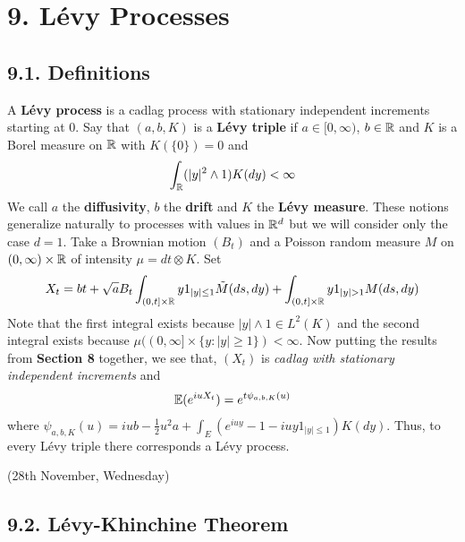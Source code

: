 \documentclass[12pt,a4paper]{report}
\begin{document}
\section*{9. L\'{e}vy Processes}

\subsection{9.1. Definitions}

A \textbf{L\'{e}vy process} is a cadlag process with stationary independent increments starting at 0. Say that $(a,b,K)$ is a \textbf{L\'{e}vy triple} if $a\in [0,\infty)$, $b\in \mathbb{R}$ and $K$ is a Borel measure on $\mathbb{R}$ with $K(\{0\}) =0$ and
\begin{align*}
\int_{\mathbb{R}} (|y|^2 \wedge 1) K(dy) < \infty
\end{align*}
We call $a$ the \textbf{diffusivity}, $b$ the \textbf{drift} and $K$ the \textbf{L\'{e}vy measure}. These notions generalize naturally to processes with values in $\mathbb{R}^d$ but we will consider only the case $d = 1$. Take a Brownian motion $(B_t)$ and a Poisson random measure $M$ on $(0,\infty) \times \mathbb{R}$ of intensity $\mu = dt \otimes K$. Set
\begin{align*}
X_t = bt + \sqrt{a} B_t \int_{(0,t]\times \reals} y1_{|y| \leq 1} \tilde{M}(ds,dy) + \int_{(0,t] \times \reals} y1_{|y|>1} M(ds,dy)
\end{align*}
Note that the first integral exists because $|y|\wedge 1 \in L^2(K)$ and the second integral exists because $\mu((0,\infty] \times \{y: |y|\geq 1\}   ) < \infty$. Now putting the results from \textbf{Section 8} together, we see that, $(X_t)$ is \emph{cadlag with stationary independent increments} and
\begin{align*}
\mathbb{E}(e^{iu X_t}) = e^{t\psi_{a,b,K}(u)}
\end{align*}
where $\psi_{a,b,K}(u) = iub - \frac{1}{2}u^2a  + \int_E (e^{iuy} - 1 - iuy1_{|y|\leq 1}) K(dy)$. Thus, to every L\'{e}vy triple there corresponds a L\'{e}vy process.
\s

\newday

(28th November, Wednesday)

\subsection*{9.2. L\'{e}vy-Khinchine Theorem}
\end{document}
